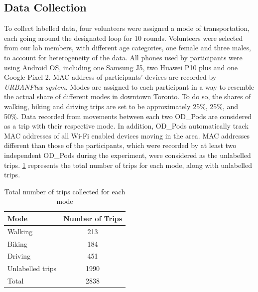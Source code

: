 \subsection{Data Collection}
To collect labelled data, four volunteers were assigned a mode of transportation, each going around the designated loop for 10 rounds. Volunteers were selected from our lab members, with different age categories, one female and three males, to account for heterogeneity of the data. All phones used by participants were using Android OS, including one Samsung J5, two Huawei P10 plus and one Google Pixel 2. MAC address of participants' devices are recorded by \emph{URBANFlux system}. Modes are assigned to each participant in a way to resemble the actual share of different modes in downtown Toronto. To do so, the shares of walking, biking and driving trips are set to be approximately 25\%, 25\%, and 50\%. Data recorded from movements between each two OD\_Pods are considered as a trip with their respective mode. In addition, OD\_Pods automatically track MAC addresses of all Wi-Fi enabled devices moving in the area. MAC addresses different than those of the participants, which were recorded by at least two independent OD\_Pods during the experiment, were considered as the unlabelled trips. \cref{tab:Total} represents the total number of trips for each mode, along with unlabelled trips.

\begin{table}[ht]
\centering
\label{tab:Tripsum}
\caption{Total number of trips collected for each mode}
\begin{tabular}{|l|c|}
\hline
    {\textbf{Mode}} & {\textbf{Number of Trips}} \\
\hline
\hline
{Walking} & 213  \\
{Biking} &        184     \\
{Driving} &        451     \\
{Unlabelled trips} &        1990     \\
\hline
\hline
Total & 2838\\
\hline
\end{tabular}
\label{tab:Total}
\end{table}


